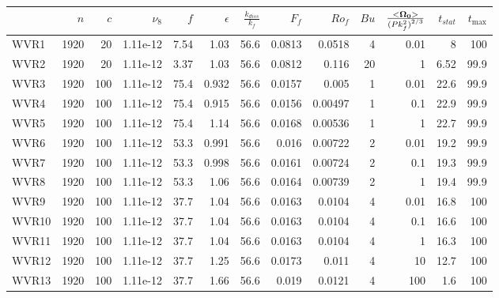 \documentclass[a4paper]{article}
\begin{document}
\begin{tabular}{lrrrrrrrrrrrr}
\toprule
{} &   $n$ &  $c$ &  $\nu_8$ &  $f$ &  $\epsilon$ &  $\frac{k_{diss}}{k_f}$ &  $F_f$ &  $Ro_f$ &  $Bu$ &  $\frac{<\bf \Omega_0 >}{{(P k_f^2)}^{2/3}}$ &  $t_{stat}$ &  $t_{\max}$ \\
\midrule
WVR1  &  1920 &   20 & 1.11e-12 & 7.54 &        1.03 &                    56.6 & 0.0813 &  0.0518 &     4 &                                         0.01 &           8 &         100 \\
WVR2  &  1920 &   20 & 1.11e-12 & 3.37 &        1.03 &                    56.6 & 0.0812 &   0.116 &    20 &                                            1 &        6.52 &        99.9 \\
WVR3  &  1920 &  100 & 1.11e-12 & 75.4 &       0.932 &                    56.6 & 0.0157 &   0.005 &     1 &                                         0.01 &        22.6 &        99.9 \\
WVR4  &  1920 &  100 & 1.11e-12 & 75.4 &       0.915 &                    56.6 & 0.0156 & 0.00497 &     1 &                                          0.1 &        22.9 &        99.9 \\
WVR5  &  1920 &  100 & 1.11e-12 & 75.4 &        1.14 &                    56.6 & 0.0168 & 0.00536 &     1 &                                            1 &        22.7 &        99.9 \\
WVR6  &  1920 &  100 & 1.11e-12 & 53.3 &       0.991 &                    56.6 &  0.016 & 0.00722 &     2 &                                         0.01 &        19.2 &        99.9 \\
WVR7  &  1920 &  100 & 1.11e-12 & 53.3 &       0.998 &                    56.6 & 0.0161 & 0.00724 &     2 &                                          0.1 &        19.3 &        99.9 \\
WVR8  &  1920 &  100 & 1.11e-12 & 53.3 &        1.06 &                    56.6 & 0.0164 & 0.00739 &     2 &                                            1 &        19.4 &        99.9 \\
WVR9  &  1920 &  100 & 1.11e-12 & 37.7 &        1.04 &                    56.6 & 0.0163 &  0.0104 &     4 &                                         0.01 &        16.8 &         100 \\
WVR10 &  1920 &  100 & 1.11e-12 & 37.7 &        1.04 &                    56.6 & 0.0163 &  0.0104 &     4 &                                          0.1 &        16.6 &         100 \\
WVR11 &  1920 &  100 & 1.11e-12 & 37.7 &        1.04 &                    56.6 & 0.0163 &  0.0104 &     4 &                                            1 &        16.3 &         100 \\
WVR12 &  1920 &  100 & 1.11e-12 & 37.7 &        1.25 &                    56.6 & 0.0173 &   0.011 &     4 &                                           10 &        12.7 &         100 \\
WVR13 &  1920 &  100 & 1.11e-12 & 37.7 &        1.66 &                    56.6 &  0.019 &  0.0121 &     4 &                                          100 &         1.6 &         100 \\
\bottomrule
\end{tabular}
\end{document}
